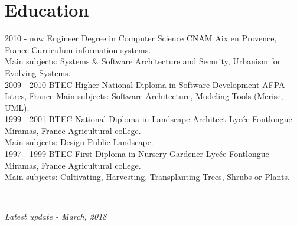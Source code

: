 \documentclass[]{friggeri-cv}
\begin{document}
\section{Education}
\begin{entrylist}
    \entry
        {2010 - now}
        {Engineer Degree in Computer Science}
        {CNAM Aix en Provence, France}
        {Curriculum information systems.\\
        Main subjects: Systems \& Software Architecture and Security,
        Urbanism for Evolving Systems.\\}
    \entry
        {2009 - 2010}
        {BTEC Higher National Diploma in Software Development}
        {AFPA Istres, France}
        {Main subjects: Software Architecture, Modeling Tools (Merise, UML).\\}
    \entry
        {1999 - 2001}
        {BTEC National Diploma in Landscape Architect}
        {Lycée Fontlongue Miramas, France}
        {Agricultural college.\\
        Main subjects: Design Public Landscape.\\}
    \entry
        {1997 - 1999}
        {BTEC First Diploma in Nursery Gardener}
        {Lycée Fontlongue Miramas, France}
        {Agricultural college.\\
        Main subjects: Cultivating, Harvesting, Transplanting Trees, Shrubs or Plants.}
\end{entrylist}


~
\begin{flushright}
    \emph{Latest update - March, 2018}
\end{flushright}
\end{document}
